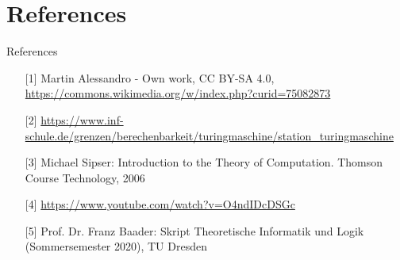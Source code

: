 \documentclass[aspectratio=169]{beamer}
\begin{document}
	\section{References}
	\begin{frame}{References}
		\begin{itemize}
			\item [{[1]}] Martin Alessandro - Own work, CC BY-SA 4.0, \url{https://commons.wikimedia.org/w/index.php?curid=75082873} \label{ref:automata}
			\item [{[2]}] \url{https://www.inf-schule.de/grenzen/berechenbarkeit/turingmaschine/station_turingmaschine} \label{ref:turing}
			\item [{[3]}] Michael Sipser: Introduction to the Theory of Computation. Thomson Course Technology, 2006
			\item [{[4]}] \url{https://www.youtube.com/watch?v=O4ndIDcDSGc}
			\item [{[5]}] Prof. Dr. Franz Baader: Skript Theoretische Informatik und Logik (Sommersemester 2020), TU Dresden
		\end{itemize}
	\end{frame}
\end{document}
